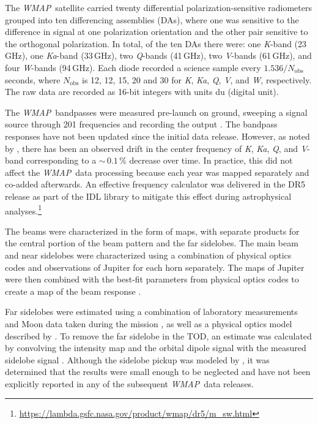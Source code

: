\documentclass[twocolumn]{../../common/aa}
\def\WMAP{\emph{WMAP}}
\newcommand{\K}[0]{\textit K}
\newcommand{\Ka}[0]{\textit{Ka}}
\newcommand{\Q}[0]{\textit Q}
\newcommand{\V}[0]{\textit V}
\newcommand{\W}[0]{\textit W}
\begin{document}
The \WMAP\ satellite carried twenty differential polarization-sensitive
radiometers grouped into ten differencing assemblies (DAs), where one 
was sensitive to the difference in signal at one polarization
orientation and the other pair sensitive to the orthogonal
polarization. In total, of the ten DAs there were:
one \K-band (23\,GHz), one \Ka-band (33\,GHz), two \Q-bands (41\,GHz),
two \V-bands (61\,GHz), and four \W-bands (94\,GHz). Each diode recorded a science sample every $1.536/N_\mathrm{obs}$ seconds, where $N_\mathrm{obs}$ is 12, 12, 15, 20 and 30 for \K, \Ka, \Q, \V, and \W, respectively. The raw data are recorded as 16-bit integers with units du (digital unit).

The \WMAP\ bandpasses were measured pre-launch on ground, sweeping a signal source through 201 frequencies and recording the output \citep{jarosik2003:MAP}. The bandpass responses have not been updated since the initial data release. However, as noted by \citet{bennett2012}, there has been an observed drift in the center frequency of \K, \Ka, \Q, and \V-band corresponding to a $\sim$$\,0.1\,\%$ decrease over time. In practice, this did not affect the \WMAP\ data processing because each year was mapped separately and co-added afterwards. An effective frequency calculator was delivered in the DR5 release as part of the IDL library to mitigate this effect during astrophysical analyses.\footnote{\url{https://lambda.gsfc.nasa.gov/product/wmap/dr5/m_sw.html}}

The beams were characterized in the form of maps, with separate products for the central portion of the beam pattern and the far sidelobes. The main beam and near sidelobes were characterized using a combination of physical optics codes and observations of Jupiter for each horn separately. The maps of Jupiter were then combined with the best-fit parameters from physical optics codes to create a map of the beam response \citep{hill2009,weiland2010,bennett2012}.

Far sidelobes were estimated using a combination of laboratory measurements and Moon data taken during the mission \citep{barnes2003}, as well as a physical optics model described by \citet{hinshaw2009}. To remove the far sidelobe  in the TOD, an estimate was calculated by convolving the intensity map and the orbital dipole signal with the measured sidelobe signal \citep{jarosik2007}. Although the sidelobe pickup was modeled by \citet{barnes2003}, it was determined that the results were small enough to be neglected and have not been explicitly reported in any of the subsequent \WMAP\ data releases.
\end{document}
